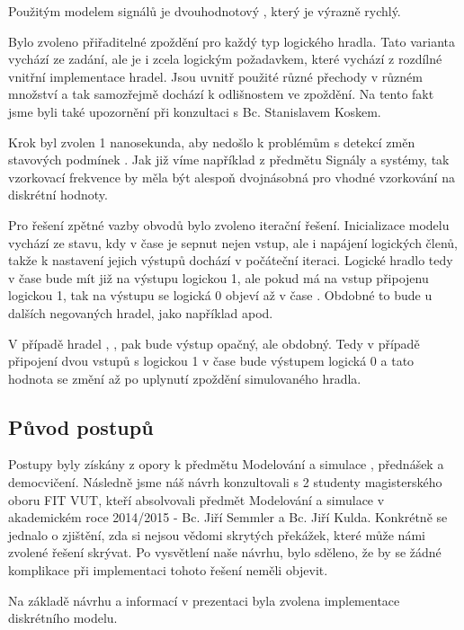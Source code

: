 \documentclass[11pt,a4paper]{article}
\begin{document}
			Použitým modelem signálů je dvouhodnotový , který je výrazně rychlý.

			Bylo zvoleno přiřaditelné zpoždění  pro každý typ logického hradla. Tato varianta vychází ze zadání, ale je i zcela logickým požadavkem, které vychází z rozdílné vnitřní implementace hradel. Jsou uvnitř použité různé přechody v různém množství a tak samozřejmě dochází k odlišnostem ve zpoždění. Na tento fakt jsme byli také upozornění při konzultaci s Bc. Stanislavem Koskem.

			Krok byl zvolen 1 nanosekunda, aby nedošlo k problémům s detekcí změn stavových podmínek . Jak již víme například z předmětu Signály a systémy, tak vzorkovací frekvence by měla být alespoň dvojnásobná pro vhodné vzorkování na diskrétní hodnoty.

			Pro řešení zpětné vazby obvodů bylo zvoleno iterační řešení. Inicializace modelu  vychází ze stavu, kdy v čase  je sepnut nejen vstup, ale i napájení logických členů, takže k nastavení jejich výstupů dochází v počáteční iteraci. Logické hradlo  tedy v čase  bude mít již na výstupu logickou 1, ale pokud má na vstup připojenu logickou 1, tak na výstupu se logická 0 objeví až v čase . Obdobné to bude u dalších negovaných hradel, jako například  apod.

			V případě hradel , ,  pak bude výstup opačný, ale obdobný. Tedy v případě připojení dvou vstupů s logickou 1 v čase  bude výstupem logická 0 a tato hodnota se změní až po uplynutí zpoždění simulovaného hradla.

		\subsection{Původ postupů}
			Postupy byly získány z opory k předmětu Modelování a simulace \cite{imsSlide}, přednášek a democvičení. Následně jsme náš návrh konzultovali s 2 studenty magisterského oboru FIT VUT, kteří absolvovali předmět Modelování a simulace v akademickém roce 2014/2015 - Bc. Jiří Semmler a Bc. Jiří Kulda. Konkrétně se jednalo o zjištění, zda si nejsou vědomi skrytých překážek, které může námi zvolené řešení skrývat. Po vysvětlení naše návrhu, bylo sděleno, že by se žádné komplikace při implementaci tohoto řešení neměli objevit.

			Na základě návrhu a informací v prezentaci  byla zvolena implementace diskrétního modelu.
\end{document}
